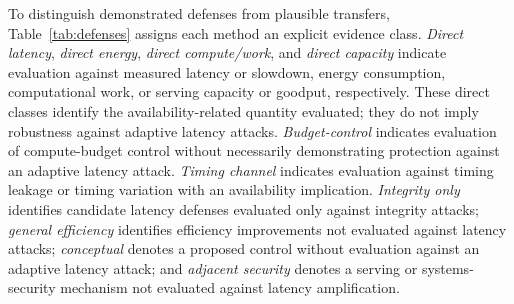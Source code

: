 \documentclass[acmsmall,screen,review,nonacm]{acmart}
\begin{document}

To distinguish demonstrated defenses from plausible transfers,
Table~\ref{tab:defenses} assigns each method an explicit evidence class.
\emph{Direct latency}, \emph{direct energy}, \emph{direct compute/work}, and
\emph{direct capacity} indicate evaluation against measured latency or
slowdown, energy consumption, computational work, or serving capacity or
goodput, respectively. These direct classes identify the availability-related
quantity evaluated; they do not imply robustness against adaptive latency
attacks. \emph{Budget-control} indicates evaluation of compute-budget control
without necessarily demonstrating protection against an adaptive latency
attack. \emph{Timing channel} indicates evaluation against timing leakage or
timing variation with an availability implication. \emph{Integrity only}
identifies candidate latency defenses evaluated only against integrity
attacks; \emph{general efficiency} identifies efficiency improvements not
evaluated against latency attacks; \emph{conceptual} denotes a proposed
control without evaluation against an adaptive latency attack; and
\emph{adjacent security} denotes a serving or systems-security mechanism not
evaluated against latency amplification.
\end{document}

